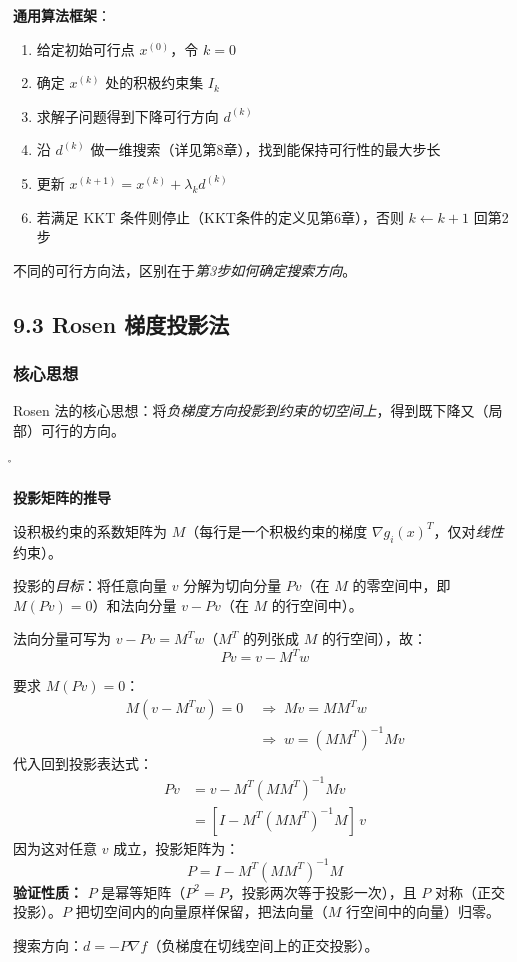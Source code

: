 \textbf{通用算法框架}：
\begin{enumerate}
  \item 给定初始可行点 $x^{(0)}$，令 $k=0$
  \item 确定 $x^{(k)}$ 处的积极约束集 $I_k$
  \item 求解子问题得到下降可行方向 $d^{(k)}$
  \item 沿 $d^{(k)}$ 做一维搜索（详见第8章），找到能保持可行性的最大步长
  \item 更新 $x^{(k+1)} = x^{(k)} + \lambda_k d^{(k)}$
  \item 若满足 KKT 条件则停止（KKT条件的定义见第6章），否则 $k \leftarrow k+1$ 回第2步
\end{enumerate}

不同的可行方向法，区别在于\emph{第3步如何确定搜索方向}。

\subsection{9.3 Rosen 梯度投影法}

\subsubsection{核心思想}

Rosen 法的核心思想：将\emph{负梯度方向投影到约束的切空间上}，得到既下降又（局部）可行的方向。

\r{}

\begin{defbox}
\textbf{投影矩阵的推导}

设积极约束的系数矩阵为 $M$（每行是一个积极约束的梯度 $\nabla g_i(x)^T$，仅对\emph{线性}约束）。

投影的\emph{目标}：将任意向量 $v$ 分解为切向分量 $Pv$（在 $M$ 的零空间中，即 $M(Pv)=0$）和法向分量 $v-Pv$（在 $M$ 的行空间中）。

法向分量可写为 $v-Pv = M^T w$（$M^T$ 的列张成 $M$ 的行空间），故：
\[
Pv = v - M^T w
\]

要求 $M(Pv)=0$：
\begin{align*}
M(v - M^T w) = 0
\;&\Longrightarrow\; Mv = MM^T w \\
&\Longrightarrow\; w = (MM^T)^{-1} Mv
\end{align*}
代入回到投影表达式：
\begin{align*}
Pv &= v - M^T(MM^T)^{-1} Mv \\
   &= [I - M^T(MM^T)^{-1} M]\,v
\end{align*}
因为这对任意 $v$ 成立，投影矩阵为：
\[
\boxed{P = I - M^T (M M^T)^{-1} M}
\]
\textbf{验证性质：} $P$ 是幂等矩阵（$P^2=P$，投影两次等于投影一次），且 $P$ 对称（正交投影）。$P$ 把切空间内的向量原样保留，把法向量（$M$ 行空间中的向量）归零。

搜索方向：$d = -P \nabla f$（负梯度在切线空间上的正交投影）。
\end{defbox}

